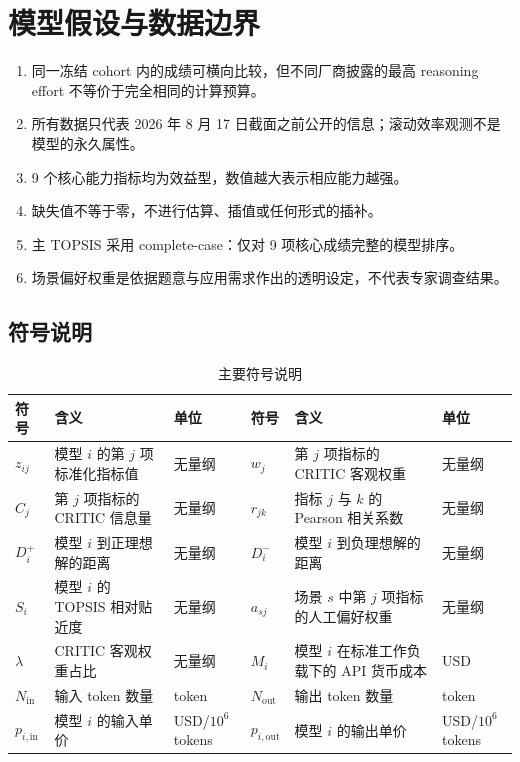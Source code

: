 \documentclass[UTF8,zihao=-4,a4paper,fontset=none]{ctexart}
\begin{document}
\section{模型假设与数据边界}

\begin{enumerate}[label=(\arabic*),leftmargin=3em]
  \item 同一冻结 cohort 内的成绩可横向比较，但不同厂商披露的最高 reasoning effort 不等价于完全相同的计算预算。
  \item 所有数据只代表 2026 年 8 月 17 日截面之前公开的信息；滚动效率观测不是模型的永久属性。
  \item 9 个核心能力指标均为效益型，数值越大表示相应能力越强。
  \item 缺失值不等于零，不进行估算、插值或任何形式的插补。
  \item 主 TOPSIS 采用 complete-case：仅对 9 项核心成绩完整的模型排序。
  \item 场景偏好权重是依据题意与应用需求作出的透明设定，不代表专家调查结果。
\end{enumerate}

\subsection{符号说明}

\begin{table}[H]
  \centering
  \small
  \caption{主要符号说明}
  \label{tab:symbols}
  \begin{tabularx}{\textwidth}{C{1.4cm}X C{1.7cm}C{1.4cm}X C{1.7cm}}
    \toprule
    符号 & 含义 & 单位 & 符号 & 含义 & 单位 \\
    \midrule
    $z_{ij}$ & 模型 $i$ 的第 $j$ 项标准化指标值 & 无量纲 &
    $w_j$ & 第 $j$ 项指标的 CRITIC 客观权重 & 无量纲 \\
    $C_j$ & 第 $j$ 项指标的 CRITIC 信息量 & 无量纲 &
    $r_{jk}$ & 指标 $j$ 与 $k$ 的 Pearson 相关系数 & 无量纲 \\
    $D_i^+$ & 模型 $i$ 到正理想解的距离 & 无量纲 &
    $D_i^-$ & 模型 $i$ 到负理想解的距离 & 无量纲 \\
    $S_i$ & 模型 $i$ 的 TOPSIS 相对贴近度 & 无量纲 &
    $a_{sj}$ & 场景 $s$ 中第 $j$ 项指标的人工偏好权重 & 无量纲 \\
    $\lambda$ & CRITIC 客观权重占比 & 无量纲 &
    $M_i$ & 模型 $i$ 在标准工作负载下的 API 货币成本 & USD \\
    $N_{\mathrm{in}}$ & 输入 token 数量 & token &
    $N_{\mathrm{out}}$ & 输出 token 数量 & token \\
    $p_{i,\mathrm{in}}$ & 模型 $i$ 的输入单价 & USD/$10^6$ tokens &
    $p_{i,\mathrm{out}}$ & 模型 $i$ 的输出单价 & USD/$10^6$ tokens \\
    \bottomrule
  \end{tabularx}
\end{table}
\end{document}
